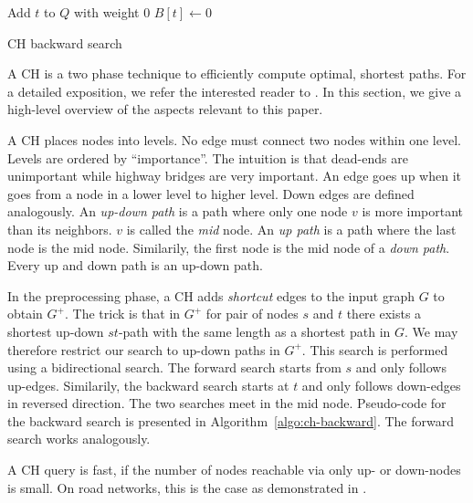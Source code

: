 \documentclass[a4paper,UKenglish,cleveref, autoref]{lipics-v2019}
\begin{document}
\begin{algorithm2e}
Add $t$ to $Q$ with weight 0\;
$B[t] \leftarrow 0$\;
\caption{CH backward search}
\label{algo:ch-backward}
\end{algorithm2e}

A CH is a two phase technique to efficiently compute optimal, shortest paths.
For a detailed exposition, we refer the interested reader to \cite{CCH, CH}.
In this section, we give a high-level overview of the aspects relevant to this paper.

A CH places nodes into levels.
No edge must connect two nodes within one level.
Levels are ordered by ``importance''.
The intuition is that dead-ends are unimportant while highway bridges are very important.
An edge goes up when it goes from a node in a lower level to higher level.
Down edges are defined analogously.
An \emph{up-down path} is a path where only one node $v$ is more important than its neighbors.
$v$ is called the \emph{mid} node.
An \emph{up path} is a path where the last node is the mid node.
Similarily, the first node is the mid node of a \emph{down path}.
Every up and down path is an up-down path.

In the preprocessing phase, a CH adds \emph{shortcut} edges to the input graph $G$ to obtain $G^+$.
The trick is that in $G^+$ for pair of nodes $s$ and $t$ there exists a shortest up-down $st$-path with the same length as a shortest path in $G$.
We may therefore restrict our search to up-down paths in $G^+$.
This search is performed using a bidirectional search.
The forward search starts from $s$ and only follows up-edges.
Similarily, the backward search starts at $t$ and only follows down-edges in reversed direction.
The two searches meet in the mid node.
Pseudo-code for the backward search is presented in Algorithm~\ref{algo:ch-backward}.
The forward search works analogously.

A CH query is fast, if the number of nodes reachable via only up- or down-nodes is small.
On road networks, this is the case as demonstrated in \cite{ch,punch,crp,cch,flowcutter}.
\end{document}
